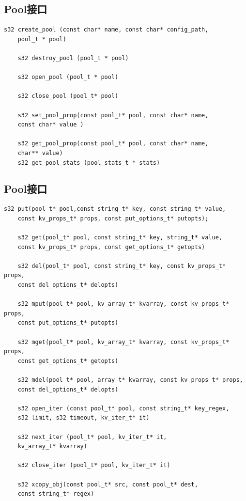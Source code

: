 		\subsection{Pool接口}
			\begin{Verbatim}[frame = none]
    s32 create_pool (const char* name, const char* config_path, 
    pool_t * pool)

    s32 destroy_pool (pool_t * pool)

    s32 open_pool (pool_t * pool)

    s32 close_pool (pool_t* pool)

    s32 set_pool_prop(const pool_t* pool, const char* name, 
    const char* value )

    s32 get_pool_prop(const pool_t* pool, const char* name, 
    char** value)
    s32 get_pool_stats (pool_stats_t * stats)

			\end{Verbatim}

		\subsection{Pool接口}
			\begin{Verbatim}[frame = none]
    s32 put(pool_t* pool,const string_t* key, const string_t* value,
    const kv_props_t* props, const put_options_t* putopts);

    s32 get(pool_t* pool, const string_t* key, string_t* value, 
    const kv_props_t* props, const get_options_t* getopts)

    s32 del(pool_t* pool, const string_t* key, const kv_props_t* props, 
    const del_options_t* delopts)

    s32 mput(pool_t* pool, kv_array_t* kvarray, const kv_props_t* props, 
    const put_options_t* putopts)

    s32 mget(pool_t* pool, kv_array_t* kvarray, const kv_props_t* props, 
    const get_options_t* getopts)

    s32 mdel(pool_t* pool, array_t* kvarray, const kv_props_t* props, 
    const del_options_t* delopts)

    s32 open_iter (const pool_t* pool, const string_t* key_regex, 
    s32 limit, s32 timeout, kv_iter_t* it)

    s32 next_iter (pool_t* pool, kv_iter_t* it, 
    kv_array_t* kvarray)

    s32 close_iter (pool_t* pool, kv_iter_t* it)

    s32 xcopy_obj(const pool_t* src, const pool_t* dest,
    const string_t* regex)

			\end{Verbatim}